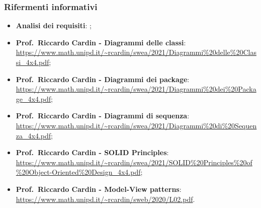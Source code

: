 \subsubsection{Rifermenti informativi}
\begin{itemize}
	\item \textbf{Analisi dei requisiti}: ;
	\item \textbf{Prof.\ Riccardo Cardin - Diagrammi delle classi}: \url{https://www.math.unipd.it/~rcardin/swea/2021/Diagrammi\%20delle\%20Classi_4x4.pdf};
	\item \textbf{Prof.\ Riccardo Cardin - Diagrammi dei package}: \url{https://www.math.unipd.it/~rcardin/swea/2021/Diagrammi\%20dei\%20Package_4x4.pdf};
	\item \textbf{Prof.\ Riccardo Cardin - Diagrammi di sequenza}: \url{https://www.math.unipd.it/~rcardin/swea/2021/Diagrammi\%20di\%20Sequenza_4x4.pdf};
	\item \textbf{Prof.\ Riccardo Cardin - SOLID Principles}: \url{https://www.math.unipd.it/~rcardin/swea/2021/SOLID\%20Principles\%20of\%20Object-Oriented\%20Design_4x4.pdf};
	\item \textbf{Prof.\ Riccardo Cardin - Model-View patterns}: \url{https://www.math.unipd.it/~rcardin/sweb/2020/L02.pdf}.
\end{itemize}